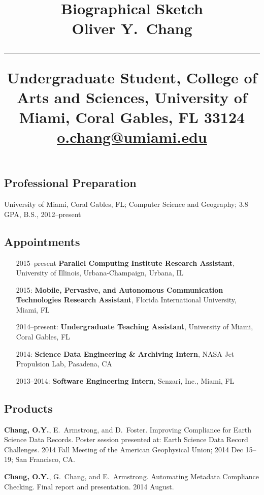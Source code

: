 \documentclass[svgnames,11pt]{article}
\title{%
        \vspace{-2\baselineskip}
            \normalsize
            Biographical Sketch\\
            \vspace{0.2\baselineskip}
            {\large\textbf{Oliver Y.~Chang}}\\
            \vspace{0.5\baselineskip}
            \hrule
            \vspace{0.5\baselineskip}
            Undergraduate Student, College of Arts and Sciences,
            University of Miami, Coral Gables, FL 33124\\
            \href{mailto:o.chang@umiami.edu}{o.chang@umiami.edu}
        \vspace{-1.5ex}
        }
\date{}
\author{}
\begin{document}
\maketitle
\vspace{-4\baselineskip}

\subsection{Professional Preparation}

    University of Miami, Coral Gables, FL;
        Computer Science and Geography;
        3.8 GPA, B.S., 2012--present

\subsection{Appointments}

\begin{itemize}[label={--9999:},leftmargin=*,itemsep=0pt]

    \item[2015--present]
        \textbf{Parallel Computing Institute Research Assistant},
        University of Illinois, Urbana-Champaign,
        Urbana, IL

    \item[2015:]
        \textbf{Mobile, Pervasive, and Autonomous Communication Technologies Research Assistant},
        Florida International University,
        Miami, FL

    \item[2014--present:]
        \textbf{Undergraduate Teaching Assistant},
        University of Miami,
        Coral Gables, FL

    \item[2014:]
        \textbf{Science Data Engineering \& Archiving Intern},
        NASA Jet Propulsion Lab,
        Pasadena, CA

    \item[2013--2014:]
        \textbf{Software Engineering Intern},
        Senzari, Inc.,
        Miami, FL

\end{itemize}

\subsection{Products}

\begin{bibenum}[itemsep=5pt]

    \item \textbf{Chang, O.Y.}, E.~Armstrong, and D.~Foster.
        Improving Compliance for Earth Science Data Records.
        Poster session presented at: Earth Science Data Record Challenges.
        2014 Fall Meeting of the American Geophysical Union; 2014 Dec 15--19; San Francisco, CA.

    \item \textbf{Chang, O.Y.}, G.~Chang, and E.~Armstrong.
        Automating Metadata Compliance Checking.
        Final report and presentation. 2014 August.

\end{bibenum}
\end{document}
